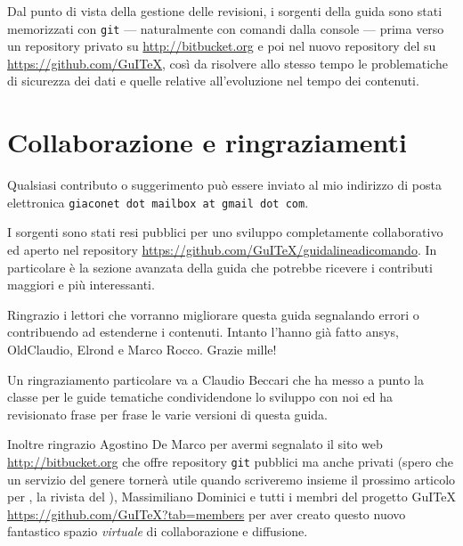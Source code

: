 Dal punto di vista della gestione delle revisioni, i sorgenti della guida sono stati memorizzati con \texttt{git} --- naturalmente con comandi dalla console --- prima verso un repository privato su \url{http://bitbucket.org} e poi nel nuovo repository del \GuIT*{} su \url{https://github.com/GuITeX}, così da risolvere allo stesso tempo le problematiche di sicurezza dei dati e quelle relative all'evoluzione nel tempo dei contenuti.

\section{Collaborazione e ringraziamenti}

Qualsiasi contributo o suggerimento può essere inviato al mio indirizzo di posta elettronica \texttt{giaconet dot mailbox at gmail dot com}.

I sorgenti sono stati resi pubblici per uno sviluppo completamente collaborativo ed aperto nel repository \url{https://github.com/GuITeX/guidalineadicomando}. In particolare è la sezione avanzata della guida che potrebbe ricevere i contributi maggiori e più interessanti.

Ringrazio i lettori che vorranno migliorare questa guida segnalando errori o contribuendo ad estenderne i contenuti. Intanto l'hanno già fatto \textsf{ansys}, \textsf{OldClaudio}, \textsf{Elrond} e Marco Rocco. Grazie mille!

Un ringraziamento particolare va a Claudio Beccari che ha messo a punto la classe per le guide tematiche condividendone lo sviluppo con noi ed ha revisionato frase per frase le varie versioni di questa guida.

Inoltre ringrazio Agostino De Marco per avermi segnalato il sito web \url{http://bitbucket.org} che offre repository \texttt{git} pubblici ma anche privati (spero che un servizio del genere tornerà utile quando scriveremo insieme il prossimo articolo per \Ars, la rivista del \GuIT*), Massimiliano Dominici e tutti i membri del progetto GuITeX  \url{https://github.com/GuITeX?tab=members} per aver creato questo nuovo fantastico spazio \emph{virtuale} di collaborazione e diffusione.



